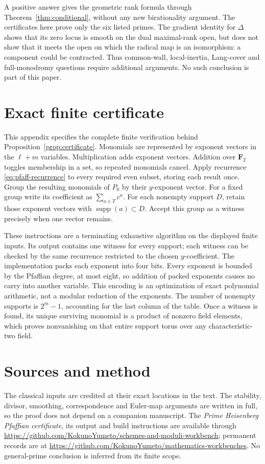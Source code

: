 \documentclass[11pt]{article}
\theoremstyle{definition}\newtheorem{definition}[theorem]{Definition}
\theoremstyle{remark}\newtheorem{remark}[theorem]{Remark}
\newcommand{\FF}{\mathbf F}
\newcommand{\workbenchurl}{https://github.com/KokunoYumeto/schemes-and-moduli-workbench}
\newcommand{\recordurl}{https://github.com/KokunoYumeto/mathematics-workbenches}
\begin{document}
A positive answer gives the geometric rank formula through Theorem~\ref{thm:conditional}, without any new birationality argument. The certificates here prove only the six listed primes. The gradient identity for $\Delta$ shows that its zero locus is smooth on the dual maximal-rank open, but does not show that it meets the open on which the radical map is an isomorphism: a component could be contracted. Thus common-wall, local-inertia, Lang-cover and full-monodromy questions require additional arguments. No such conclusion is part of this paper.

\appendix
\section{Exact finite certificate}\label{app:certificate}

This appendix specifies the complete finite verification behind Proposition~\ref{prop:certificate}. Monomials are represented by exponent vectors in the $\ell+m$ variables. Multiplication adds exponent vectors. Addition over $\FF_2$ toggles membership in a set, so repeated monomials cancel. Apply recurrence \eqref{eq:pfaff-recurrence} to every required even subset, storing each result once. Group the resulting monomials of $P_0$ by their $y$-exponent vector. For a fixed group write its coefficient as $\sum_{a\in T}c^a$. For each nonempty support $D$, retain those exponent vectors with $\operatorname{supp}(a)\subset D$. Accept this group as a witness precisely when one vector remains.

These instructions are a terminating exhaustive algorithm on the displayed finite inputs. Its output contains one witness for every support; each witness can be checked by the same recurrence restricted to the chosen $y$-coefficient. The implementation packs each exponent into four bits. Every exponent is bounded by the Pfaffian degree, at most eight, so addition of packed exponents causes no carry into another variable. This encoding is an optimization of exact polynomial arithmetic, not a modular reduction of the exponents. The number of nonempty supports is $2^m-1$, accounting for the last column of the table. Once a witness is found, its unique surviving monomial is a product of nonzero field elements, which proves nonvanishing on that entire support torus over any characteristic-two field.

\section*{Sources and method}
The classical inputs are credited at their exact locations in the text. The stability, divisor, smoothing, correspondence and Euler-map arguments are written in full, so the proof does not depend on a companion manuscript. The \emph{Prime Heisenberg Pfaffian certificate}, its output and build instructions are available through \url{\workbenchurl}; permanent records are at \url{\recordurl}. No general-prime conclusion is inferred from its finite scope.
\end{document}
